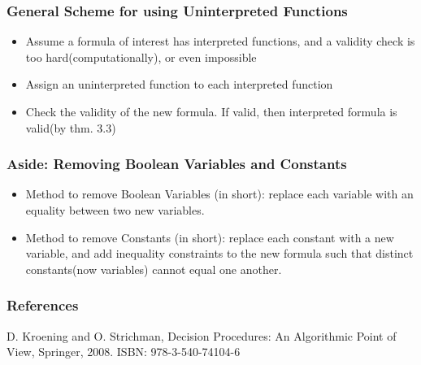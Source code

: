 \documentclass{beamer}
\begin{document}
\begin{frame}

 \frametitle{General Scheme for using Uninterpreted Functions}
 
 \begin{itemize}
 \item Assume a formula of interest has interpreted functions, and a validity check is too hard(computationally), or even impossible

 \item Assign an uninterpreted function to each interpreted function
 \item Check the validity of the new formula.  If valid, then interpreted formula is valid(by thm. 3.3)

 \end{itemize}
 
\end{frame}

\begin{frame}

 \frametitle{Aside:  Removing Boolean Variables and Constants}
 
 \begin{itemize}
 
 \item Method to remove Boolean Variables (in short):  replace each variable with an equality between two new variables.
 \item Method to remove Constants (in short):  replace each constant with a new variable, and add inequality constraints to the new formula such that distinct constants(now variables) cannot equal one another.
 
 \end{itemize}
 
\end{frame}

\nocite{Coker::Principles-of-R,Haldar:04:Semantic-Remote,Fabrega:1999aa,Ryan:09:Introduction-to}

\begin{frame}
  \frametitle{References}
  
  D. Kroening and O. Strichman, Decision Procedures: An Algorithmic Point of View, Springer, 2008. ISBN: 978-3-540-74104-6
\end{frame}
\end{document}
